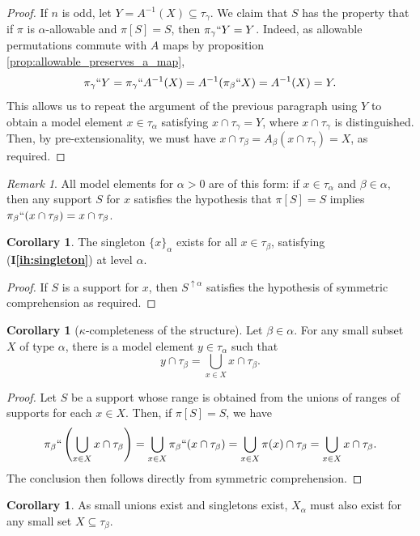 \documentclass{article}
\theoremstyle{definition}
\newtheorem{corollary}[theorem]{Corollary}
\theoremstyle{remark}
\newtheorem{remark}[theorem]{Remark}
\newcommand{\ihref}[1]{(\textbf{I\ref{#1}})}
\begin{document}
{\begin{proof}
If $n$ is odd, let $Y = A^{-1}(X) \subseteq \tau_\gamma$.
We claim that $S$ has the property that if $\pi$ is $\alpha$-allowable and $\pi[S] = S$, then $\pi_\gamma``Y = Y$.
Indeed, as allowable permutations commute with $A$ maps by proposition \ref{prop:allowable_preserves_a_map},
$$\pi_\gamma``Y = \pi_\gamma``A^{-1}(X) = A^{-1}(\pi_\beta``X) = A^{-1}(X) = Y.$$
This allows us to repeat the argument of the previous paragraph using $Y$ to obtain a model element $x \in \tau_\alpha$ satisfying $x \cap \tau_\gamma = Y$, where $x \cap \tau_\gamma$ is distinguished.
Then, by pre-extensionality, we must have $x \cap \tau_\beta = A_\beta(x \cap \tau_\gamma) = X$, as required.
\end{proof}
\begin{remark}
  All model elements for $\alpha > 0$ are of this form: if $x \in \tau_\alpha$ and $\beta \in \alpha$, then any support $S$ for $x$ satisfies the hypothesis that $\pi[S] = S$ implies $\pi_\beta``(x \cap \tau_\beta) = x \cap \tau_\beta$.
\end{remark}
\begin{corollary}
The singleton $\{x\}_\alpha$ exists for all $x \in \tau_\beta$, satisfying \ihref{ih:singleton} at level $\alpha$.
\end{corollary}
\begin{proof}
If $S$ is a support for $x$, then $S^{\uparrow \alpha}$ satisfies the hypothesis of symmetric comprehension as required.
\end{proof}

\begin{corollary}[$\kappa$-completeness of the structure]
Let $\beta \in \alpha$.
For any small subset $X$ of type $\alpha$, there is a model element $y \in \tau_\alpha$ such that $$y \cap \tau_\beta = \bigcup_{x \in X} x \cap \tau_\beta.$$
\end{corollary}
\begin{proof}
Let $S$ be a support whose range is obtained from the unions of ranges of supports for each $x \in X$.
Then, if $\pi[S] = S$, we have
$$\pi_\beta``\left(\bigcup_{x \in X} x \cap \tau_\beta\right) = \bigcup_{x \in X} \pi_\beta``(x \cap \tau_\beta) = \bigcup_{x \in X} \pi(x) \cap \tau_\beta = \bigcup_{x \in X} x \cap \tau_\beta.$$
The conclusion then follows directly from symmetric comprehension.
\end{proof}

\begin{corollary}
As small unions exist and singletons exist, $X_\alpha$ must also exist for any small set $X \subseteq \tau_\beta$.
\end{corollary}

}
\end{document}
